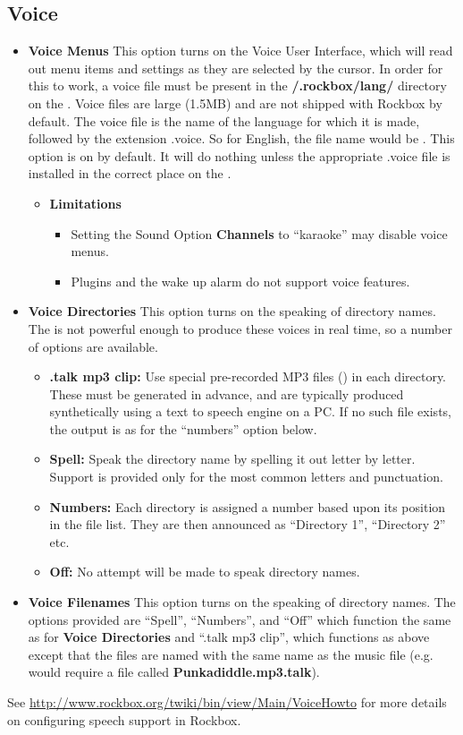 \subsection{\label{ref:Voiceconfiguration}Voice}
\begin{itemize}
\item \textbf{Voice Menus}
  This option turns on the Voice User Interface, which will read out menu items and settings as they are selected by the cursor.  In order for this to work, a voice file must be present in the \textbf{/.rockbox/lang/} directory on the \dap.  Voice files are large (1.5MB) and are not shipped with Rockbox by default.
  The voice file is the name of the language for which it is made, followed by the extension .voice.  So for English, the file name would be .
  This option is on by default.  It will do nothing unless the appropriate .voice file is installed in the correct place on the \dap.
  \begin{itemize}
  \item \textbf{Limitations}
    \begin{itemize}
    \item Setting the Sound Option \textbf{Channels} to ``karaoke'' may disable voice menus.
    \item Plugins and the wake up alarm do not support voice features.
    \end{itemize}
  \end{itemize}

\item \textbf{Voice Directories}
  This option turns on the speaking of directory names.  The \dap is not powerful enough to produce these voices in real time, so a number of options are available.
  \begin{itemize}
  \item \textbf{.talk mp3 clip: }
    Use special pre{}-recorded MP3 files () in each directory.  These must be generated in advance, and are typically produced synthetically using a text to speech engine on a PC.  If no such file exists, the output is as for the ``numbers'' option below.
  \item \textbf{Spell: }
    Speak the directory name by spelling it out letter by letter.  Support is provided only for the most common letters and punctuation.
  \item \textbf{Numbers: }
    Each directory is assigned a number based upon its position in the file list.  They are then announced as ``Directory 1'', ``Directory 2'' etc.
  \item \textbf{Off: }
    No attempt will be made to speak directory names.
  \end{itemize}

\item \textbf{Voice Filenames}
  This option turns on the speaking of directory names.  The options provided are ``Spell'', ``Numbers'', and ``Off'' which function the same as for \textbf{Voice Directories} and ``.talk mp3 clip'', which functions as above except that the files are named with the same name as the music file (e.g.  would require a file called \textbf{Punkadiddle.mp3.talk}).
\end{itemize}
See \url{http://www.rockbox.org/twiki/bin/view/Main/VoiceHowto} for more details on configuring speech support in Rockbox.
